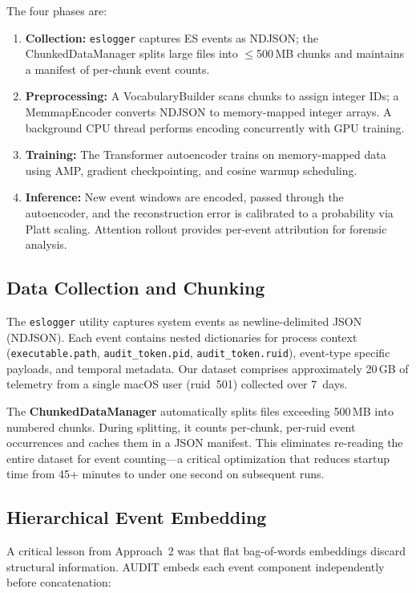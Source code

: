 \documentclass[letterpaper,twocolumn,10pt]{article}
\begin{document}
The four phases are:
\begin{enumerate}[nosep,leftmargin=*]
\item \textbf{Collection:} \texttt{eslogger} captures ES events as
  NDJSON; the ChunkedDataManager splits large files into
  $\leq$500\,MB chunks and maintains a manifest of per-chunk event
  counts.
\item \textbf{Preprocessing:} A VocabularyBuilder scans chunks to
  assign integer IDs; a MemmapEncoder converts NDJSON to
  memory-mapped integer arrays.  A background CPU thread performs
  encoding concurrently with GPU training.
\item \textbf{Training:} The Transformer autoencoder trains on
  memory-mapped data using AMP, gradient checkpointing, and cosine
  warmup scheduling.
\item \textbf{Inference:} New event windows are encoded, passed
  through the autoencoder, and the reconstruction error is
  calibrated to a probability via Platt scaling.  Attention rollout
  provides per-event attribution for forensic analysis.
\end{enumerate}


\subsection{Data Collection and Chunking}

The \texttt{eslogger} utility captures system events as
newline-delimited JSON (NDJSON).  Each event contains nested
dictionaries for process context (\texttt{executable.path},
\texttt{audit\_token.pid}, \texttt{audit\_token.ruid}), event-type
specific payloads, and temporal metadata.  Our dataset comprises
approximately 20\,GB of telemetry from a single macOS user
(ruid~501) collected over 7~days.

The \textbf{ChunkedDataManager} automatically splits files
exceeding 500\,MB into numbered chunks.  During splitting, it
counts per-chunk, per-ruid event occurrences and caches them in a
JSON manifest.  This eliminates re-reading the entire dataset for
event counting---a critical optimization that reduces startup time
from 45+ minutes to under one second on subsequent runs.

\subsection{Hierarchical Event Embedding}

A critical lesson from Approach~2 was that flat bag-of-words
embeddings discard structural information.  AUDIT embeds each
event component independently before concatenation:
\end{document}
